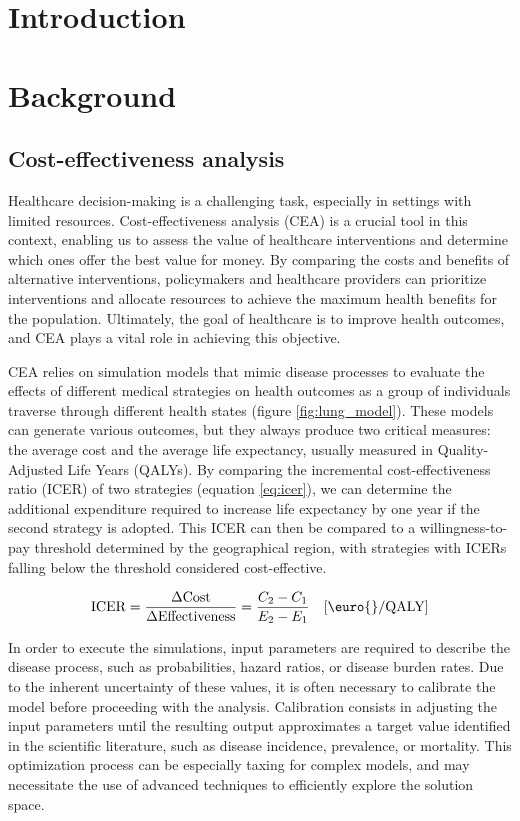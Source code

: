 \documentclass{IOS-Book-Article}
\begin{document}
	\section{Introduction}
	
	\section{Background}
	\subsection{Cost-effectiveness analysis}
	Healthcare decision-making is a challenging task, especially in settings with limited resources. Cost-effectiveness analysis (CEA) is a crucial tool in this context, enabling us to assess the value of healthcare interventions and determine which ones offer the best value for money. By comparing the costs and benefits of alternative interventions, policymakers and healthcare providers can prioritize interventions and allocate resources to achieve the maximum health benefits for the population. Ultimately, the goal of healthcare is to improve health outcomes, and CEA plays a vital role in achieving this objective.
	
	CEA relies on simulation models that mimic disease processes to evaluate the effects of different medical strategies on health outcomes as a group of individuals traverse through different health states (figure \ref{fig:lung_model}). These models can generate various outcomes, but they always produce two critical measures: the average cost and the average life expectancy, usually measured in Quality-Adjusted Life Years (QALYs). By comparing the incremental cost-effectiveness ratio (ICER) of two strategies (equation \ref{eq:icer}), we can determine the additional expenditure required to increase life expectancy by one year if the second strategy is adopted. This ICER can then be compared to a willingness-to-pay threshold determined by the geographical region, with strategies with ICERs falling below the threshold considered cost-effective.
	
	\begin{equation}
		\label{eq:icer}
		\textnormal{ICER}=\frac{\Delta \textrm{Cost}}{\Delta \textrm{Effectiveness}} = \frac{C_2-C_1}{E_2-E_1} \quad [\euro{}/\textrm{QALY}]
	\end{equation}
	
	In order to execute the simulations, input parameters are required to describe the disease process, such as probabilities, hazard ratios, or disease burden rates. Due to the inherent uncertainty of these values, it is often necessary to calibrate the model before proceeding with the analysis. Calibration consists in adjusting the input parameters until the resulting output approximates a target value identified in the scientific literature, such as disease incidence, prevalence, or mortality. This optimization process can be especially taxing for complex models, and may necessitate the use of advanced techniques to efficiently explore the solution space.
	
\end{document}
